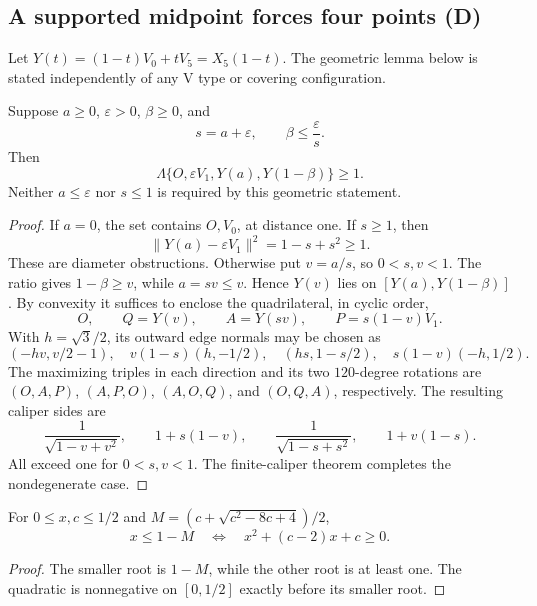 \begin{samepage}
\subsection{A supported midpoint forces four points (D)}

Let $Y(t)=(1-t)V_0+tV_5=X_5(1-t)$. The geometric lemma below is stated
independently of any V type or covering configuration.

\begin{theorem}
\label{thm:fixed-four-point-rescuer}
\label{lem:appendix-fixed-four-point}
Suppose $a\ge0$, $\varepsilon>0$, $\beta\ge0$, and
\[
 s=a+\varepsilon,\qquad \beta\le\frac{\varepsilon}{s}.
\]
Then
\[
 \Lambda\{O,\varepsilon V_1,Y(a),Y(1-\beta)\}\ge1.
\]
Neither $a\le\varepsilon$ nor $s\le1$ is required by this geometric statement.
\end{theorem}
\begin{proof}
If $a=0$, the set contains $O,V_0$, at distance one. If $s\ge1$, then
\[
 \|Y(a)-\varepsilon V_1\|^2=1-s+s^2\ge1.
\]
These are diameter obstructions. Otherwise put $v=a/s$, so $0<s,v<1$.
The ratio gives $1-\beta\ge v$, while $a=sv\le v$. Hence $Y(v)$ lies
on $[Y(a),Y(1-\beta)]$. By convexity it suffices to enclose the quadrilateral,
in cyclic order,
\[
 O,\qquad Q=Y(v),\qquad A=Y(sv),\qquad P=s(1-v)V_1.
\]
With $h=\sqrt3/2$, its outward edge normals may be chosen as
\[
 (-hv,v/2-1),\quad v(1-s)(h,-1/2),\quad
 (hs,1-s/2),\quad s(1-v)(-h,1/2).
\]
The maximizing triples in each direction and its two $120$-degree rotations
are $(O,A,P)$, $(A,P,O)$, $(A,O,Q)$, and $(O,Q,A)$, respectively.
The resulting caliper sides are
\[
 \frac1{\sqrt{1-v+v^2}},\qquad 1+s(1-v),\qquad
 \frac1{\sqrt{1-s+s^2}},\qquad 1+v(1-s).
\]
All exceed one for $0<s,v<1$. The finite-caliper theorem
 completes the nondegenerate case.
\end{proof}



\end{samepage}

\begin{lemma}
\label{lem:rescuer-ratio-test}
For $0\le x,c\le1/2$ and $M=(c+\sqrt{c^2-8c+4})/2$,
\[
 x\le1-M\quad\Longleftrightarrow\quad x^2+(c-2)x+c\ge0.
\]
\end{lemma}
\begin{proof}
The smaller root is $1-M$, while the other root is at least one.
The quadratic is nonnegative on $[0,1/2]$ exactly before its smaller root.
\end{proof}

